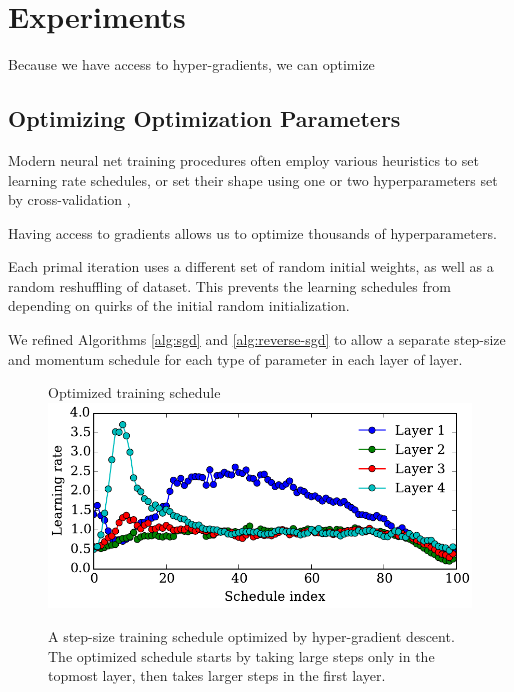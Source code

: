 \documentclass{article}
\begin{document}


\section{Experiments}

Because we have access to hyper-gradients, we can optimize



\subsection{Optimizing Optimization Parameters}

Modern neural net training procedures often employ various heuristics to set learning rate schedules, or set their shape using one or two hyperparameters set by cross-validation \citep{dahl2014multi}, \citep{sutskever2013importance}

Having access to gradients allows us to optimize thousands of hyperparameters.

Each primal iteration uses a different set of random initial weights, as well as a random reshuffling of dataset.
This prevents the learning schedules from depending on quirks of the initial random initialization.

We refined Algorithms \ref{alg:sgd} and \ref{alg:reverse-sgd} to allow a separate step-size and momentum schedule for each type of parameter in each layer of layer.

\begin{figure}[h!]
\vskip 0.2in
\begin{center}
Optimized training schedule \\
\includegraphics[width=\columnwidth]{../experiments/Feb_3_training_schedules/4_adam_100/schedules_small.pdf}
\caption{A step-size training schedule optimized by hyper-gradient descent.
The optimized schedule starts by taking large steps only in the topmost layer, then takes larger steps in the first layer.}
\label{fig:optimal schedule}
\end{center}
\vskip -0.2in
\end{figure} 
\end{document}

